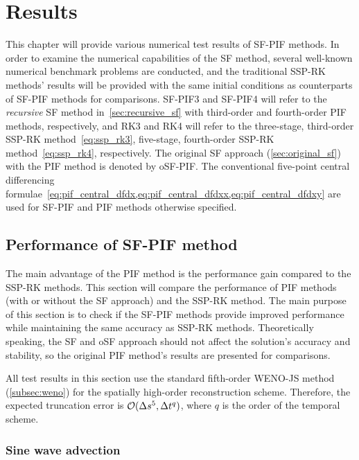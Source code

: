 \chapter{Results}\label{ch:results}

This chapter will provide various numerical test results of SF-PIF methods.
In order to examine the numerical capabilities of the SF method,
several well-known numerical benchmark problems are conducted,
and the traditional SSP-RK methods' results will be provided with the same initial conditions
as counterparts of SF-PIF methods for comparisons.
SF-PIF3 and SF-PIF4 will refer to the \textit{recursive} SF method in~\cref{sec:recursive_sf}
with third-order and fourth-order PIF methods, respectively,
and RK3 and RK4 will refer to the three-stage, third-order SSP-RK method~\cref{eq:ssp_rk3},
five-stage, fourth-order SSP-RK method~\cref{eq:ssp_rk4}, respectively.
The original SF approach (\cref{sec:original_sf}) with the PIF method is denoted by oSF-PIF\@.
The conventional five-point central differencing formulae~\cref{eq:pif_central_dfdx,eq:pif_central_dfdxx,eq:pif_central_dfdxy}
are used for SF-PIF and PIF methods otherwise specified.

\section{Performance of SF-PIF method}\label{sec:result_performance}
The main advantage of the PIF method is the performance gain compared to the SSP-RK methods.
This section will compare the performance of PIF methods (with or without the SF approach)
and the SSP-RK method. The main purpose of this section is to check if the SF-PIF methods provide
improved performance while maintaining the same accuracy as SSP-RK methods.
Theoretically speaking, the SF and oSF approach should not affect the solution's accuracy and stability,
so the original PIF method's results are presented for comparisons.

All test results in this section use the standard fifth-order WENO-JS method (\cref{subsec:weno})
for the spatially high-order reconstruction scheme.
Therefore, the expected truncation error is \( \mathcal{O}(\Delta s^{5}, \Delta t^{q}) \),
where \( q \) is the order of the temporal scheme.

\subsection{Sine wave advection}

